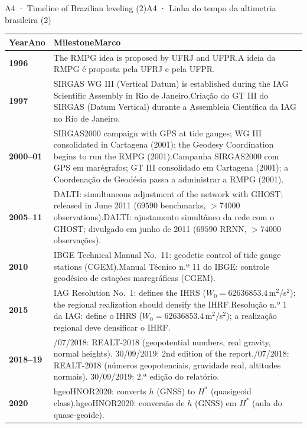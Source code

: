 \documentclass[aspectratio=169,11pt]{beamer}
\newcommand{\tr}[2]{\ifEN#2\else#1\fi}
\begin{document}
\begin{frame}{\tr{A4 · Linha do tempo da altimetria brasileira (2)}{A4 · Timeline of Brazilian leveling (2)}}
  \tiny
  \renewcommand{\arraystretch}{1.25}
  \begin{tabular}{@{}lL{11.8cm}@{}}
    \toprule
    \textbf{\tr{Ano}{Year}} & \textbf{\tr{Marco}{Milestone}} \\
    \midrule
    \textbf{1996} & \tr{A ideia da RMPG é proposta pela UFRJ e pela UFPR.}{The RMPG idea is proposed by UFRJ and UFPR.} \\
    \textbf{1997} & \tr{Criação do GT III do SIRGAS (Datum Vertical) durante a Assembleia Científica da IAG no Rio de Janeiro.}{SIRGAS WG III (Vertical Datum) is established during the IAG Scientific Assembly in Rio de Janeiro.} \\
    \textbf{2000--01} & \tr{Campanha SIRGAS2000 com GPS em marégrafos; GT III consolidado em Cartagena (2001); a Coordenação de Geodésia passa a administrar a RMPG (2001).}{SIRGAS2000 campaign with GPS at tide gauges; WG III consolidated in Cartagena (2001); the Geodesy Coordination begins to run the RMPG (2001).} \\
    \textbf{2005--11} & \tr{DALTI: ajustamento simultâneo da rede com o GHOST; divulgado em junho de 2011 ($\num{69590}$ RRNN, $>\num{74000}$ observações).}{DALTI: simultaneous adjustment of the network with GHOST; released in June 2011 ($\num{69590}$ benchmarks, $>\num{74000}$ observations).} \\
    \textbf{2010} & \tr{Manual Técnico n.º 11 do IBGE: controle geodésico de estações maregráficas (CGEM).}{IBGE Technical Manual No.~11: geodetic control of tide gauge stations (CGEM).} \\
    \textbf{2015} & \tr{Resolução n.º 1 da IAG: define o IHRS ($W_0=\num{62636853.4}$\,m$^{2}$/s$^{2}$); a realização regional deve densificar o IHRF.}{IAG Resolution No.~1: defines the IHRS ($W_0=\num{62636853.4}$\,m$^{2}$/s$^{2}$); the regional realization should densify the IHRF.} \\
    \textbf{2018--19} & \tr{30/07/2018: REALT-2018 (números geopotenciais, gravidade real, altitudes normais). 30/09/2019: 2.ª edição do relatório.}{30/07/2018: REALT-2018 (geopotential numbers, real gravity, normal heights). 30/09/2019: 2nd edition of the report.} \\
    \textbf{2020} & \tr{hgeoHNOR2020: conversão de $h$ (GNSS) em $H^{*}$ (aula do quase-geoide).}{hgeoHNOR2020: converts $h$ (GNSS) to $H^{*}$ (quasigeoid class).} \\

\end{tabular}
\end{frame}
\end{document}
